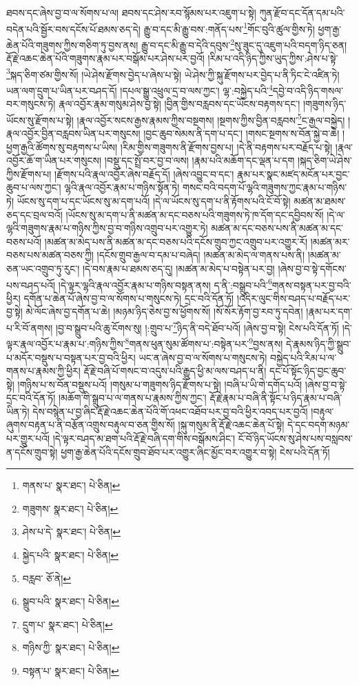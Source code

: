 ཐབས་དང་ཞེས་བྱ་བ་ལ་སོགས་པ་ལ། ཐབས་དང་ཤེས་རབ་སྙོམས་པར་འཇུག་པ་སྟེ། ཀུན་རྫོབ་དང་དོན་དམ་པའི་བདེན་པའི་སྦྱོར་བས་དངོས་པོ་ཐམས་ཅད་དེ། རྒྱུ་བ་དང་མི་རྒྱུ་བས་:གནོད་པས་\footnote{གནས་པ་  སྣར་ཐང་།  པེ་ཅིན། }གོང་བུའི་ཚུལ་གྱིས་ཏེ། ཕྱག་རྒྱ་ཆེན་པོའི་གཟུགས་ཀྱིས་གཅིག་ཏུ་བྱས་ནས། རྒྱུ་བ་དང་མི་རྒྱུ་བ་དེའི་དབུས་\footnote{གཟུགས་  སྣར་ཐང་།  པེ་ཅིན། }སུ་ཟུང་དུ་འཇུག་པའི་བདག་ཉིད་ཅན། རྡོ་རྗེ་འཆང་ཆེན་པོའི་གཟུགས་རྣམ་པར་བསྒོམ་པར་ཤེས་པར་བྱའོ། །རིམ་པ་འདི་ཉིད་ཀྱིས་ཡུད་ཀྱིས་:ཤེས་པ་སྟེ་\footnote{ཤེས་པ་དེ་  སྣར་ཐང་།  པེ་ཅིན། }སྐད་ཅིག་ཙམ་གྱིས་སོ། །ཡེ་ཤེས་རྫོགས་བྱེད་པ་ཞེས་པ་སྟེ། ཡེ་ཤེས་ཀྱི་སྐུ་རྫོགས་པར་བྱེད་པ་ནི་ཏིང་ངེ་འཛིན་ཏེ། ཡན་ལག་དྲུག་པ་ཡིན་པར་བཤད་དོ། །དཔལ་སྒྱུ་འཕྲུལ་དྲ་བ་ལས་ཀྱང་། ལྷ་:བསྐྱེད་པའི་\footnote{སྐྱེད་པའི་  སྣར་ཐང་།  པེ་ཅིན། }དབྱེ་བ་འདི་ཉིད་གསལ་བར་གསུངས་ཏེ། རྣལ་འབྱོར་རྣམ་གསུམ་ཤེས་བྱ་སྟེ། །བྱིན་གྱིས་བརླབས་དང་ཡོངས་བརྟགས་དང་། །གཟུགས་ཉིད་ཡོངས་སུ་རྫོགས་པ་སྟེ། །རྣལ་འབྱོར་སངས་རྒྱས་རྣམས་ཀྱིས་བསྔགས། །སྔགས་ཀྱིས་བྱིན་བརླབས་\footnote{བརླབ་  ཅོ་ནེ། }ང་རྒྱལ་བསྐྱེད། །རྣལ་འབྱོར་བྱིན་བརླབས་ཡིན་པར་གསུངས། །བྱང་ཆུབ་སེམས་ནི་དག་པ་དང་། །གསང་སྔགས་ས་བོན་སྐྱེ་བ་ཆེ། །ཕྱག་རྒྱའི་ཚོགས་སུ་བརྟགས་པ་ཡིས། །རིམ་གྱིས་གཟུགས་ནི་རྫོགས་བྱས་པ། །དེ་ནི་བརྟགས་པར་བརྗོད་པ་སྟེ། །རྣལ་འབྱོར་ཆོ་ག་ཡིན་པར་གསུངས། །བསྡུ་དང་སྤྲོ་བར་བྱ་བ་ལས། །རྣམ་པའི་མཆོག་དང་ལྡན་པ་དག །སྐད་ཅིག་ཡེ་ཤེས་ཀྱིས་རྫོགས་པ། །རྫོགས་པའི་རྣལ་འབྱོར་ཞེས་བརྗོད་དོ། །ཞེས་འབྱུང་བ་དང་། རྣམ་པར་སྣང་མཛད་མངོན་པར་བྱང་ཆུབ་པ་ལས་ཀྱང་། ལྷའི་རྣལ་འབྱོར་རྣམ་པ་གཉིས་སྟོན་ཏེ། གསང་བའི་བདག་པོ་ལྷའི་གཟུགས་ཀྱང་རྣམ་པ་གཉིས་ཏེ། ཡོངས་སུ་དག་པ་དང་ཡོངས་སུ་མ་དག་པའོ། །དེ་ལ་ཡོངས་སུ་དག་པ་ནི་རྟོགས་པའི་ངོ་བོ་སྟེ། མཚན་མ་ཐམས་ཅད་དང་བྲལ་བའོ། །ཡོངས་སུ་མ་དག་པ་ནི་མཚན་མ་དང་བཅས་པའི་གཟུགས་ཏེ་ཁ་དོག་དང་དབྱིབས་སོ། །དེ་ལ་ལྷའི་གཟུགས་རྣམ་པ་གཉིས་ཀྱིས་བྱ་བ་གཉིས་འགྲུབ་པར་འགྱུར་ཏེ། མཚན་མ་དང་བཅས་པས་ནི་མཚན་མ་དང་བཅས་པའོ། །མཚན་མ་མེད་པས་ནི་མཚན་མ་དང་བཅས་པའི་དངོས་གྲུབ་ཀྱང་འགྲུབ་པར་འགྱུར་རོ། །མཚན་མར་བཅས་པས་མཚན་བཅས་ཀྱི། །དངོས་གྲུབ་རྒྱལ་བ་དམ་པ་བཞེད། །མཚན་མ་མེད་ལ་གནས་པས་ནི། །མཚན་མ་ཅན་ཡང་འགྲུབ་ཏུ་རུང་། །དེ་བས་རྣམ་པ་ཐམས་ཅད་དུ། །མཚན་མ་མེད་པ་བསྟེན་པར་བྱ། །ཞེས་བྱ་བ་སྟེ་དགོངས་པས་བཤད་པའོ། །དེ་ལྟར་ལྷའི་རྣལ་འབྱོར་རྣམ་པ་གཉིས་བསྟན་ནས། ད་ནི་:བསྒྲུབ་པའི་\footnote{སྒྲུབ་པའི་  སྣར་ཐང་།  པེ་ཅིན། }གནས་བསྟན་པར་བྱ་བའི་ཕྱིར། དགོན་པ་ཆེན་པོ་ཞེས་བྱ་བ་ལ་སོགས་པ་གསུངས་ཏེ། དྲང་བའི་དོན་ཏོ། །འདིར་ལུང་གིས་བཤད་པ་བརྗོད་པར་བྱ་སྟེ། མེ་ལོང་ཞེས་བྱ་དགོན་པ་ཆེ། །མཉམ་ཉིད་ཅེས་བྱ་ས་ཕྱོགས་སོ། །སོ་སོར་རྟོག་བྱ་རབ་ཏུ་དབེན། །རྣམ་པར་དག་པ་རི་བོ་ནགས། །བྱ་བ་སྒྲུབ་པའི་ཆུ་ངོགས་སུ། །:གྲུབ་པ་\footnote{དྲུག་པ་  སྣར་ཐང་།  པེ་ཅིན། }ཉིད་ནི་བདེ་ཐོབ་པའོ། །ཞེས་བྱ་བ་སྟེ། ངེས་པའི་དོན་ཏོ། །དེ་ལྟར་རྣལ་འབྱོར་པ་རྣམ་པ་:གཉིས་ཀྱིས་\footnote{གཉིས་ཀྱི་  སྣར་ཐང་།  པེ་ཅིན། }གནས་ཕུན་སུམ་ཚོགས་པ་:བསྟེན་པར་\footnote{བསྟན་པ་  སྣར་ཐང་།  པེ་ཅིན། }བྱས་ནས། དེ་རྣམས་ཉིད་ཀྱི་སྒྲུབ་པ་མདོར་བསྡུས་པ་བསྟན་པར་བྱ་བའི་ཕྱིར། ཡང་ན་ཞེས་བྱ་བ་ལ་སོགས་པ་གསུངས་ཏེ། བསྐྱེད་པའི་རིམ་པ་ལ་གནས་པ་རྣམས་ཀྱི་ཕྱིར། རྡོ་རྗེ་བཞི་པོ་གསང་བ་འདུས་པའི་རྒྱུད་ཕྱི་མ་ལས་བཤད་པ་ནི། དང་པོ་སྟོང་ཉིད་བྱང་ཆུབ་སྟེ། །གཉིས་པ་ས་བོན་བསྡུས་པའོ། །གསུམ་པ་གཟུགས་ཉིད་རྫོགས་པ་སྟེ། །བཞི་པ་ཡི་གེ་དགོད་པའོ། །ཞེས་བྱ་བ་སྟེ་དྲང་བའི་དོན་ཏོ། །མཆོག་གི་སྒྲུབ་པ་ལ་གནས་པ་རྣམས་ཀྱིས་ཀྱང་། རྡོ་རྗེ་རྣམ་པ་བཞི་ནི་སྟོང་པ་ཉིད་རྣམ་པ་བཞི་ཡིན་ཏེ། དེས་བསྙེན་པ་བྱ་ཞིང་རྡོ་རྗེ་འཆང་ཆེན་པོའི་གོ་འཕང་འཐོབ་པར་བྱ་བའི་ཕྱིར་འབད་པར་བྱའོ། །བརྟུལ་ཞུགས་བརྟན་པ་ནི་བརྩོན་འགྲུས་བརྟུལ་བ་ཅན་གྱིས་སོ། །སྐུ་གསུམ་ནི་རྡོ་རྗེ་འཆང་ཆེན་པོ་སྟེ། དེ་དང་བདག་མཉམ་པར་གྱུར་པའོ། །དེ་ལྟར་བཤད་མ་ཐག་པའི་རྡོ་རྗེ་བཞི་དག་གིས་བསྒོམས་ཤིང་། ངོ་བོ་ཉིད་ཡོངས་སུ་ཤེས་པས་བསླབས་ན་དངོས་གྲུབ་སྟེ། ཕྱག་རྒྱ་ཆེན་པོའི་དངོས་གྲུབ་ཐོབ་པར་འགྱུར་ཞིང་མྱོང་བར་འགྱུར་བ་སྟེ། ངེས་པའི་དོན་ཏོ། 